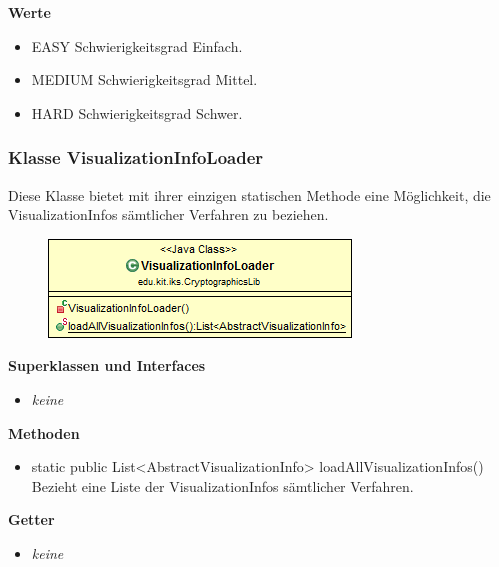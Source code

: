 \documentclass{article}
\begin{document}
      \textbf{Werte}
      \begin{itemize}
        \item EASY \newline
          Schwierigkeitsgrad \glqq Einfach\grqq.
        \item MEDIUM \newline
          Schwierigkeitsgrad \glqq Mittel\grqq.
        \item HARD \newline
          Schwierigkeitsgrad \glqq Schwer\grqq.
      \end{itemize}
	
	\subsubsection{Klasse VisualizationInfoLoader}
	  Diese Klasse bietet mit ihrer einzigen statischen Methode eine Möglichkeit, 
	  die VisualizationInfos sämtlicher Verfahren zu beziehen.
	
      \begin{figure}[H]
        \centering
        \includegraphics{resources/edu-kit-iks-CryptographicsLib-VisualizationInfoLoader}
      \end{figure}
	
      \textbf{Superklassen und Interfaces}
      \begin{itemize}
        \item \textit{keine}
      \end{itemize}
	
      \textbf{Methoden}
      \begin{itemize}
        \item static public List<AbstractVisualizationInfo> loadAllVisualizationInfos() \newline
          Bezieht eine Liste der VisualizationInfos sämtlicher Verfahren.
      \end{itemize}
      
      \textbf{Getter}
      \begin{itemize}
		\item \textit{keine}
      \end{itemize}
      
\end{document}
